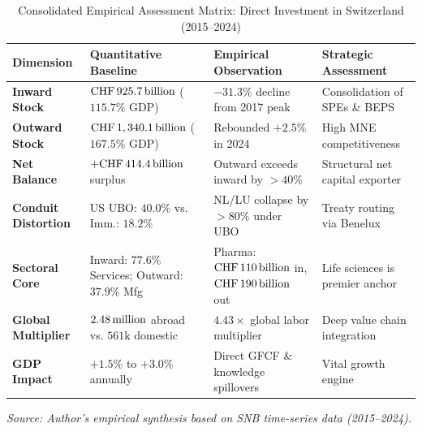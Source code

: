 \begin{table}[H]
\centering
\small
\caption{Consolidated Empirical Assessment Matrix: Direct Investment in Switzerland (2015--2024)}
\label{tab:findings_matrix}
\renewcommand{\arraystretch}{1.12}
\begin{tabularx}{\textwidth}{>{\raggedright\bfseries}p{2.8cm} >{\raggedright}p{3.2cm} >{\raggedright}X >{\raggedright\arraybackslash}p{3.0cm}}
\toprule
\rowcolor{tableheadbg}
\textbf{Dimension} & \textbf{Quantitative Baseline} & \textbf{Empirical Observation} & \textbf{Strategic Assessment} \\
\midrule
\textbf{Inward Stock} & $\text{CHF}\,925.7\,\text{billion}$ ($115.7\%$ GDP) & $-31.3\%$ decline from 2017 peak & Consolidation of SPEs \& BEPS \\
\rowcolor{tablerowbg}
\textbf{Outward Stock} & $\text{CHF}\,1,340.1\,\text{billion}$ ($167.5\%$ GDP) & Rebounded $+2.5\%$ in 2024 & High MNE competitiveness \\
\textbf{Net Balance} & $+\text{CHF}\,414.4\,\text{billion}$ surplus & Outward exceeds inward by $>40\%$ & Structural net capital exporter \\
\rowcolor{tablerowbg}
\textbf{Conduit Distortion} & US UBO: $40.0\%$ vs. Imm.: $18.2\%$ & NL/LU collapse by $>80\%$ under UBO & Treaty routing via Benelux \\
\textbf{Sectoral Core} & Inward: $77.6\%$ Services; Outward: $37.9\%$ Mfg & Pharma: $\text{CHF}\,110\,\text{billion}$ in, $\text{CHF}\,190\,\text{billion}$ out & Life sciences is premier anchor \\
\rowcolor{tablerowbg}
\textbf{Global Multiplier} & $2.48\,\text{million}$ abroad vs. $561\text{k}$ domestic & $4.43\times$ global labor multiplier & Deep value chain integration \\
\textbf{GDP Impact} & $+1.5\%$ to $+3.0\%$ annually & Direct GFCF \& knowledge spillovers & Vital growth engine \\
\bottomrule
\end{tabularx}
\par\vspace{0.3em}
\footnotesize
\textit{Source: Author's empirical synthesis based on SNB time-series data (2015--2024).}
\normalsize
\end{table}
